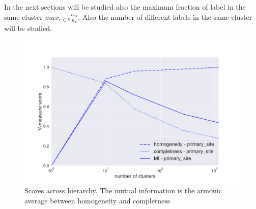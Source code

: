 In the next sections will be studied also the maximum fraction of label in the same cluster \(max_{c\in k}\frac{n_{c k}}{n_k}\).
Also the number of different labels in the same cluster will be studied.

\begin{figure}[htb!]
    \centering
    \includegraphics[width=0.9\linewidth]{pictures/topic/gtex/oversigma_10tissue/metric_scores_primarysite.pdf}
    \caption{Scores across hierarchy. The mutual information is the armonic average between homogeneity and completness}
    \label{fig:topic/gtex/oversigma_10tissue/metric_scores_primarysite}
\end{figure}